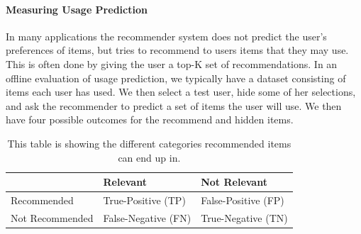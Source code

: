 
\paragraph{Measuring Usage Prediction}
\label{para:measuring_usage}
In many applications the recommender system does not predict the user's
preferences of items, but tries to recommend to users items that they may use.
This is often done by giving the user a top-K set of recommendations.
In an offline evaluation of usage prediction, we typically have a dataset
consisting of items each user has used. We then select a test user, hide some
of her selections, and ask the recommender to predict a set of items the user
will use. We then have four possible outcomes for the recommend and hidden
items.

\begin{table}[H]
	\centering
	\begin{tabular}{l l l}
	\toprule
					&	Relevant			&	Not Relevant \\ \midrule
	Recommended		&	True-Positive (TP) 	&	False-Positive (FP)	\\
	Not Recommended	&	False-Negative (FN)	&	True-Negative (TN)	\\
	\bottomrule
	\end{tabular}
	\label{table:usageprediction}
	\caption[Usage prediction (Confusion Matrix)]{This table is showing the different categories recommended items can end up in.}
\end{table}

